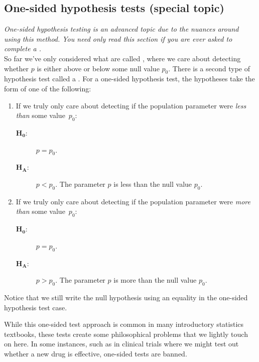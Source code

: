 \subsection{One-sided hypothesis tests (special topic)}


\emph{One-sided hypothesis testing is an advanced
    topic due to the nuances around using this method.
    You need only read this section if you are ever asked
    to complete a .} \\

So far we've only considered what are called , where we care about detecting whether $p$
is either above or below some null value $p_0$.
There is a second type of hypothesis test called a
.
For a one-sided hypothesis test,
the hypotheses take the form of one of the following:
\begin{enumerate}
\item If we truly only care about detecting if the population
    parameter were \emph{less than} some value~$p_0$:
  \begin{description}
  \item[$\mathbf{H_0}$:] $p = p_0$.
  \item[$\mathbf{H_A}$:] $p < p_0$. The parameter $p$ is less
      than the null value $p_0$.
  \end{description}
\item If we truly only care about detecting if the population
    parameter were \emph{more than} some value~$p_0$:
  \begin{description}
  \item[$\mathbf{H_0}$:] $p = p_0$.
  \item[$\mathbf{H_A}$:] $p > p_0$. The parameter $p$ is more
      than the null value $p_0$.
  \end{description}
\end{enumerate}
Notice that we still write the null hypothesis using an
equality in the one-sided hypothesis test case.

While this one-sided test approach is common in many
introductory statistics textbooks, these tests create
some philosophical problems that we lightly touch on
here. In some instances, such as in clinical trials
where we might test out whether a new drug is effective,
one-sided tests are banned.

